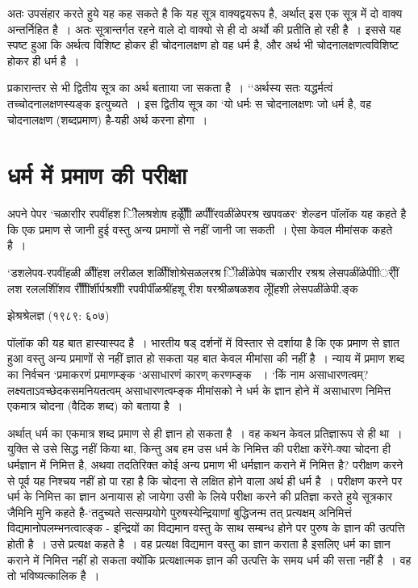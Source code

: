 {अतः उपसंहार करते हुये यह कह सकते है कि यह सूत्र वाक्यद्वयरूप है, अर्थात् इस एक सूत्र में दो वाक्य अन्तर्निहित है~। अतः सूत्रान्तर्गत रहने वाले दो वाक्यो से ही दो अर्थो की प्रतीति हो रही है~। इससे यह स्पष्ट हुआ कि अर्थत्व विशिष्ट होकर ही चोदनालक्षण हो वह धर्म है, और अर्थ भी चोदनालक्षणत्वविशिष्ट होकर ही धर्म है~। 
	
प्रकारान्तर से भी द्वितीय सूत्र का अर्थ बतााया जा सकता है~। ‘‘अर्थस्य सतः यद्धर्मत्वं तच्चोदनालक्षणस्यङ्क इत्युच्यते~। इस द्वितीय सूत्र का ‘यो धर्मः स चोदनालक्षणः जो धर्म है, वह चोदनालक्षण (शब्दप्रमाण) है-यही अर्थ करना होगा~।

\section*{धर्म में प्रमाण की परीक्षा}

अपने पेपर ‘चळाराीर रपवींहश िीेलश्रशाेष हळीीेीूं ळपीींरवळींळेपरश्र खपवळर‘ शेल्डन पॉलॉक यह कहते है कि एक प्रमाण से जानी हुई वस्तु अन्य प्रमाणों से नहीं जानी जा सकती~। ऐसा केवल मीमांसक कहते है~।

‘डशलेपव-रपवींहळी ळीींहश लरीळल शळिीींशोश्रेसळलरश्र िेीळींळेपेष चळाराीर रश्रश्र लेसपळींळेपीाीर्ीीं लश रललशिींशव रीीीींर्शीर्पश्रशीी रपवीर्पींळश्रींहशू रीश षरश्रीळषळशव लूेींहशी लेसपळींळेपी.ङ्क 

    झेश्रश्रेलज्ञ (१९८९: ६०७)

पॉलॉक की यह बात हास्यास्पद है~। भारतीय षड् दर्शनों में विस्तार से दर्शाया है कि एक प्रमाण से ज्ञात हुआ वस्तु अन्य प्रमाणों से नहीं ज्ञात हो सकता यह बात केवल मीमांसा की नहीं है~। न्याय में प्रमाण शब्द का निर्वचन ‘प्रमाकरणं प्रमाणम्ङ्क ‘असाधारणं कारण् करणम्ङ्क ~। ‘किं नाम असाधारणत्वम्? लक्ष्यताऽवच्छेदकसमनियतत्वम् असाधारणत्वम्ङ्क मीमांसको ने धर्म के ज्ञान होने में असाधारण निमित्त एकमात्र चोदना (वैदिक शब्द) को बताया है~।

अर्थात् धर्म का एकमात्र शब्द प्रमाण से ही ज्ञान हो सकता है~। वह कथन केवल प्रतिज्ञारूप से ही था~। युक्ति से उसे सिद्ध नहीं किया था, किन्तु अब हम उस धर्म के निमित्त की परीक्षा करेंगे-क्या चोदना ही धर्मज्ञान में निमित्त है, अथवा तदतिरिक्त कोई अन्य प्रमाण भी धर्मज्ञान कराने में निमित्त है? परीक्षण करने से पूर्व यह निश्चय नहीं हो पा रहा है कि चोदना से लक्षित होने वाला अर्थ ही धर्म है~। परीक्षण करने पर धर्म के निमित्त का ज्ञान अनायास हो जायेगा उसी के लिये परीक्षा करने की प्रतिज्ञा करते हुये सूत्रकार जैमिनि मुनि कहते है-‘तदुच्यते सत्सम्प्रयोगे पुरुषस्येन्द्रियाणां बुद्धिजन्म तत् प्रत्यक्षम् अनिमित्तं विद्यमानोपलम्भनत्वात्ङ्क - इन्द्रियों का विद्यमान वस्तु के साथ सम्बन्ध होने पर पुरुष के ज्ञान की उत्पत्ति होती है~। उसे प्रत्यक्ष कहते है~। वह प्रत्यक्ष विद्यमान वस्तु का ज्ञान कराता है इसलिए धर्म का ज्ञान कराने में निमित्त नहीं हो सकता क्योंकि प्रत्यक्षात्मक ज्ञान की उत्पत्ति के समय धर्म की सत्ता नहीं है~। वह तो भविष्यत्कालिक है~।

}
